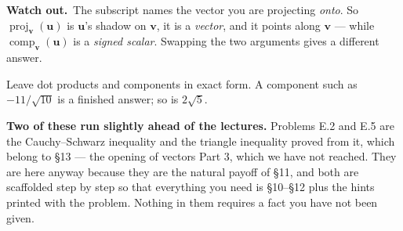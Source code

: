 \documentclass[11pt]{article}
\theoremstyle{definition}
\newcommand{\heads}[1]{\par\smallskip\noindent
  {\small\sffamily\textcolor{BrickRed}{\textbf{Watch out.}}\ #1}\par\smallskip}
\newcommand{\vc}[1]{\mathbf{#1}}
\newcommand{\proj}[2]{\operatorname{proj}_{#1}(#2)}
\newcommand{\comp}[2]{\operatorname{comp}_{#1}(#2)}
\begin{document}
\heads{The subscript names the vector you are projecting \emph{onto}. So
$\proj{\vc{v}}{\vc{u}}$ is $\vc{u}$'s shadow on $\vc{v}$, it is a \emph{vector},
and it points along $\vc{v}$ --- while $\comp{\vc{v}}{\vc{u}}$ is a
\emph{signed scalar}. Swapping the two arguments gives a different answer.}

\medskip
\noindent Leave dot products and components in exact form. A component such as
$-11/\sqrt{10}$ is a finished answer; so is $2\sqrt5$.

\medskip
\noindent \textbf{Two of these run slightly ahead of the lectures.} Problems
E.2 and E.5 are the Cauchy--Schwarz inequality and the triangle inequality
proved from it, which belong to \S13 --- the opening of vectors Part 3, which we
have not reached. They are here anyway because they are the natural payoff of
\S11, and both are scaffolded step by step so that everything you need is
\S10--\S12 plus the hints printed with the problem. Nothing in them requires a
fact you have not been given.
\end{document}
